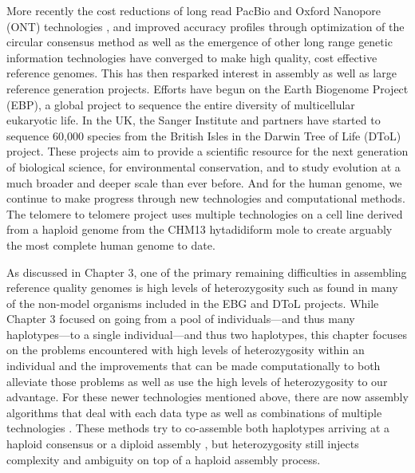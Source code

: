 \par{
More recently the cost reductions of long read PacBio and Oxford Nanopore (ONT) technologies \cite{pacbio} \cite{oxford}, and improved accuracy profiles through optimization of the circular consensus method \cite{ccs}\cite{HIFI}
as well as the emergence of other long range genetic information technologies \cite{10xlinked} \cite{HiC} \cite{bionano} 
have converged to make high quality, cost effective reference genomes. This has then resparked interest in assembly 
as well as large reference generation projects. Efforts have begun on the Earth Biogenome Project (EBP)\cite{EBGP}, a global project to sequence the entire diversity of multicellular eukaryotic life. In the UK, the Sanger Institute and partners have started to sequence 60,000 species from the British Isles in the Darwin Tree of Life (DToL) project. These projects aim to provide a scientific resource for the next generation of biological science, for environmental conservation, and to study evolution at a much broader and deeper scale than ever before. And for the human genome, we continue to make progress through new technologies and computational methods\cite{Wenger2019}\cite{tobias1}\cite{eichler1}. The telomere to telomere project uses multiple technologies on a cell line derived from a haploid genome from the CHM13 hytadidiform mole to create arguably the most complete human genome to date\cite{T2T2}\cite{T2T1}.
} \\

\par{
As discussed in Chapter 3, one of the primary remaining difficulties in assembling reference quality genomes is high levels of heterozygosity such as found in many of the non-model organisms included in the EBG and DToL projects. While Chapter 3 focused on going from a pool of individuals---and thus many haplotypes---to a single individual---and thus two haplotypes, this chapter focuses on the problems encountered with high levels of heterozygosity within an individual and the improvements that can be made computationally to both alleviate those problems as well as use the high levels of heterozygosity to our advantage. 
For these newer technologies mentioned above, there are now assembly algorithms that deal with each data type \cite{falcon} \cite{supernova} \cite{bionano_assembly} 
as well as combinations of multiple technologies \cite{genemyers} \cite{hybrid10x} \cite{hicscafffirst}\cite{hicassembly}. 
 These methods try to co-assemble both haplotypes arriving at a haploid consensus \cite{watchtower} \cite{canu} 
 or a diploid assembly \cite{falconPHASE} \cite{supernova} \cite{hifiasm}\cite{dipasm}, but heterozygosity still injects complexity and ambiguity on top of a haploid assembly process.
} \\

